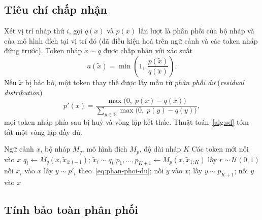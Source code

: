 \subsection{Tiêu chí chấp nhận}
\label{subsec:tieu-chi}

Xét vị trí nháp thứ $i$, gọi $q(x)$ và $p(x)$ lần lượt là phân phối của bộ nháp và của mô hình đích tại vị trí đó (đã điều kiện hoá trên ngữ cảnh và các token nháp đứng trước). Token nháp $\tilde{x}\sim q$ được chấp nhận với xác suất
\begin{equation}\label{eq:xs-chap-nhan}
  a(\tilde{x}) = \min\!\left(1,\; \frac{p(\tilde{x})}{q(\tilde{x})}\right).
\end{equation}
Nếu $\tilde{x}$ bị bác bỏ, một token thay thế được lấy mẫu từ \textit{phân phối dư} (\textit{residual distribution})
\begin{equation}\label{eq:phan-phoi-du}
  p'(x) = \frac{\max\bigl(0,\; p(x)-q(x)\bigr)}{\sum_{y\in\mathcal{V}} \max\bigl(0,\; p(y)-q(y)\bigr)},
\end{equation}
mọi token nháp phía sau bị huỷ và vòng lặp kết thúc. Thuật toán~\ref{alg:sd} tóm tắt một vòng lặp đầy đủ.

\begin{algorithm}[htbp]
\caption{Một vòng lặp giải mã suy đoán với chuỗi nháp tuyến tính~\cite{leviathan2023speculative}}
\label{alg:sd}
\begin{algorithmic}[1]
\Require Ngữ cảnh $x$, bộ nháp $M_q$, mô hình đích $M_p$, độ dài nháp $K$
\Ensure Các token mới nối vào $x$
 
  \State $q_i \gets M_q(x, \tilde{x}_{1:i-1})$; \quad $\tilde{x}_i \sim q_i$
\EndFor
\State $p_1,\dots,p_{K+1} \gets M_p(x, \tilde{x}_{1:K})$ 
  \State lấy $r \sim \mathcal{U}(0,1)$
    \State nối $\tilde{x}_i$ vào $x$ 
  \Else
    \State lấy $y \sim p'_i$ theo~\eqref{eq:phan-phoi-du}; nối $y$ vào $x$; \Return {}
  \EndIf
\EndFor
\State lấy $y \sim p_{K+1}$; nối $y$ vào $x$ 
\end{algorithmic}
\end{algorithm}

\subsection{Tính bảo toàn phân phối}
\label{subsec:lossless}

